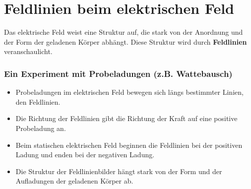 \documentclass[11pt,twoside=false,open=any]{scrbook}
\begin{document}
\begin{center}
   \setlength{\fboxrule}{2pt}
\end{center}

\section{Feldlinien beim elektrischen Feld}
Das elektrische Feld weist eine Struktur auf, die stark von der Anordnung und der Form der geladenen Körper abhängt. Diese Struktur wird durch \textbf{Feldlinien} veranschaulicht. 

\subsubsection{Ein Experiment mit Probeladungen (z.B. Wattebausch)}
\begin{itemize}
	\item Probeladungen im elektrischen Feld bewegen sich längs bestimmter Linien, den Feldlinien.
	\item Die Richtung der Feldlinien gibt die Richtung der Kraft auf eine positive Probeladung an.
	\item  Beim statischen elektrischen Feld beginnen die Feldlinien bei der positiven Ladung und enden bei der negativen Ladung.
	\item  Die Struktur der Feldlinienbilder hängt stark von der Form und der Aufladungen der geladenen Körper ab.
\end{itemize}
\end{document}
